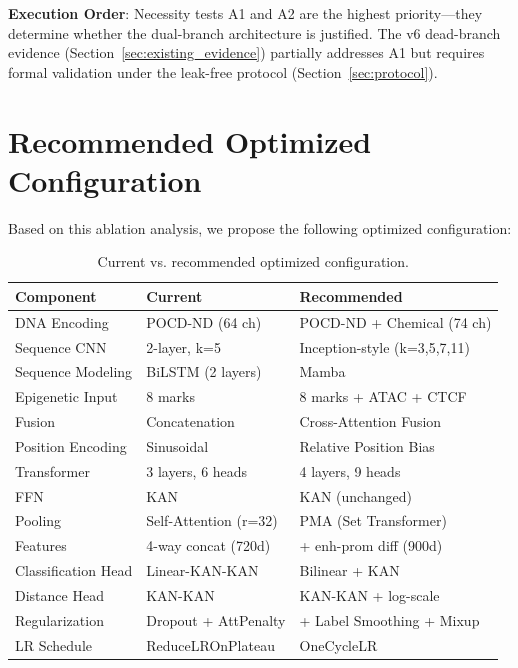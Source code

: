 \documentclass[11pt,a4paper]{article}
\begin{document}
\textbf{Execution Order}: Necessity tests A1 and A2 are the highest priority---they determine whether the dual-branch architecture is justified. The v6 dead-branch evidence (Section~\ref{sec:existing_evidence}) partially addresses A1 but requires formal validation under the leak-free protocol (Section~\ref{sec:protocol}).

\section{Recommended Optimized Configuration}

Based on this ablation analysis, we propose the following optimized configuration:

\begin{table}[H]
\centering
\begin{tabular}{L{4cm}L{4cm}L{4cm}}
\toprule
\textbf{Component} & \textbf{Current} & \textbf{Recommended} \\
\midrule
{}
DNA Encoding & POCD-ND (64 ch) & POCD-ND + Chemical (74 ch) \\
Sequence CNN & 2-layer, k=5 & Inception-style (k=3,5,7,11) \\
Sequence Modeling & BiLSTM (2 layers) & Mamba \\
Epigenetic Input & 8 marks & 8 marks + ATAC + CTCF \\
Fusion & Concatenation & Cross-Attention Fusion \\
Position Encoding & Sinusoidal & Relative Position Bias \\
Transformer & 3 layers, 6 heads & 4 layers, 9 heads \\
FFN & KAN & KAN (unchanged) \\
Pooling & Self-Attention (r=32) & PMA (Set Transformer) \\
Features & 4-way concat (720d) & + enh-prom diff (900d) \\
Classification Head & Linear-KAN-KAN & Bilinear + KAN \\
Distance Head & KAN-KAN & KAN-KAN + log-scale \\
Regularization & Dropout + AttPenalty & + Label Smoothing + Mixup \\
LR Schedule & ReduceLROnPlateau & OneCycleLR \\
\bottomrule
\end{tabular}
\caption{Current vs. recommended optimized configuration.}
\end{table}
\end{document}
